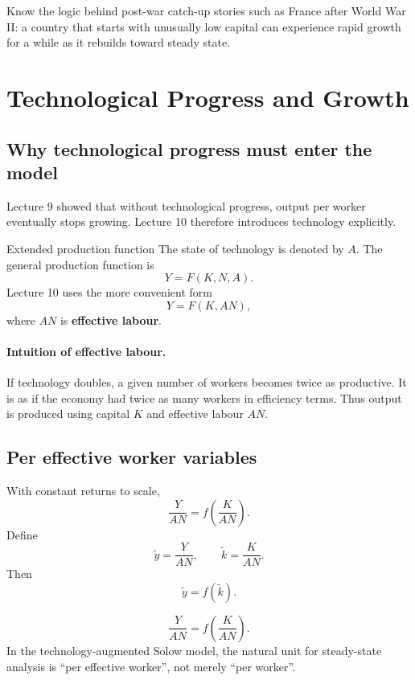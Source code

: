 \documentclass[12pt]{article}
\begin{document}
\begin{examtip}[title={Exam Focus: Likely conceptual / recognition}]
Know the logic behind post-war catch-up stories such as France after World War II: a country that starts with unusually low capital can experience rapid growth for a while as it rebuilds toward steady state.
\end{examtip}

\newpage


\section{Technological Progress and Growth}

\subsection{Why technological progress must enter the model}

Lecture 9 showed that without technological progress, output per worker eventually stops growing. Lecture 10 therefore introduces technology explicitly.

\begin{definition}{Extended production function}{}
The state of technology is denoted by $A$. The general production function is
\[
Y=F(K,N,A).
\]
Lecture 10 uses the more convenient form
\[
Y=F(K,AN),
\]
where $AN$ is \textbf{effective labour}.
\end{definition}

\paragraph{Intuition of effective labour.}
If technology doubles, a given number of workers becomes twice as productive. It is as if the economy had twice as many workers in efficiency terms. Thus output is produced using capital $K$ and effective labour $AN$.

\subsection{Per effective worker variables}

With constant returns to scale,
\[
\frac{Y}{AN}=f\!\left(\frac{K}{AN}\right).
\]
Define
\[
\tilde{y}=\frac{Y}{AN},\qquad \tilde{k}=\frac{K}{AN}.
\]
Then
\[
\tilde{y}=f(\tilde{k}).
\]

\begin{keyformula}
\[
\frac{Y}{AN}=f\!\left(\frac{K}{AN}\right).
\]
In the technology-augmented Solow model, the natural unit for steady-state analysis is ``per effective worker'', not merely ``per worker''.
\end{keyformula}
\end{document}
